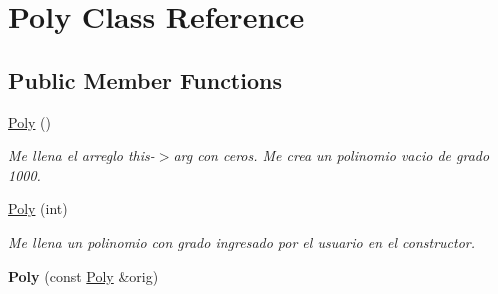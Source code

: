 \hypertarget{class_poly}{}\section{Poly Class Reference}
\label{class_poly}
\subsection*{Public Member Functions}
\begin{DoxyCompactItemize}
\item 
\hyperlink{class_poly_aa3def076b74bed67904976ad4f9fe9b1}{Poly} ()\hypertarget{class_poly_aa3def076b74bed67904976ad4f9fe9b1}{}\label{class_poly_aa3def076b74bed67904976ad4f9fe9b1}

\begin{DoxyCompactList}\small\item\em Me llena el arreglo this-\/$>$arg con ceros. Me crea un polinomio vacio de grado 1000. \end{DoxyCompactList}\item 
\hyperlink{class_poly_a7a346680adff050d4876f9e979cb6f69}{Poly} (int)
\begin{DoxyCompactList}\small\item\em Me llena un polinomio con grado ingresado por el usuario en el constructor. \end{DoxyCompactList}\item 
{\bfseries Poly} (const \hyperlink{class_poly}{Poly} \&orig)\hypertarget{class_poly_aaf0ca6e62733f4cd65d5a049da0770d7}{}\label{class_poly_aaf0ca6e62733f4cd65d5a049da0770d7}


\end{DoxyCompactItemize}
